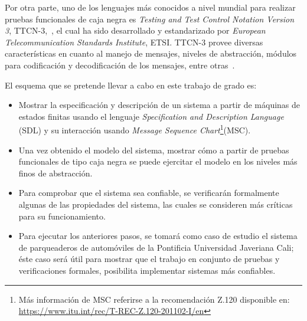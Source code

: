 Por otra parte, uno de los lenguajes m\'as conocidos a nivel mundial para 
realizar pruebas funcionales de caja negra es \textit{Testing and Test Control 
Notation Version 3}, TTCN-3,~\cite{Willcock2011,  ETSI}, el cual ha 
sido desarrollado y estandarizado por \textit{European Telecommunication 
Standards Institute}, ETSI. TTCN-3 provee diversas caracter\'isticas en cuanto 
al manejo de mensajes, niveles de abstracci\'on, m\'odulos para codificaci\'on 
y decodificaci\'on de los mensajes, entre otras~\cite{Willcock2011,ETSI}.

El esquema que se pretende llevar a cabo en este trabajo de grado es: 

\begin{itemize}
\item Mostrar la especificaci\'on y descripci\'on de un sistema a partir de 
m\'aquinas de estados finitas usando el lenguaje \textit{Specification and 
Description Language} (SDL) y su interacci\'on usando \textit{Message Sequence 
Chart}\footnote{M\'as informaci\'on de MSC referirse a la recomendaci\'on Z.120 
disponible en:  \url{https://www.itu.int/rec/T-REC-Z.120-201102-I/en}}(MSC).
\item Una vez obtenido el modelo del sistema, mostrar c\'omo a partir de 
pruebas funcionales de tipo caja negra se puede ejercitar el modelo en los 
niveles m\'as finos  de abstracci\'on. 
\item Para comprobar que el sistema sea confiable, se verificar\'an  formalmente 
algunas de las propiedades del sistema, las cuales se consideren m\'as 
cr\'iticas para su funcionamiento.
\item Para ejecutar los anteriores pasos, se tomar\'a como caso de estudio el sistema de parqueaderos de autom\'oviles de la Pontificia Universidad Javeriana 
Cali; \'este caso ser\'a \'util para mostrar que el trabajo en conjunto de 
pruebas y verificaciones formales, posibilita implementar sistemas m\'as confiables.

\end{itemize}

